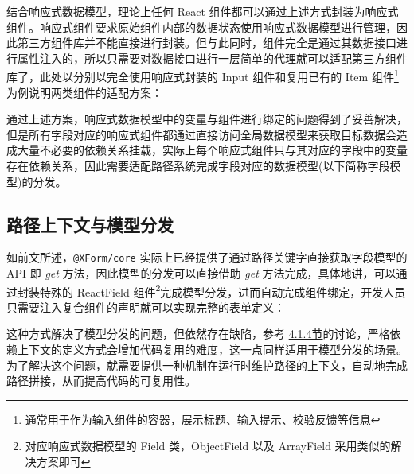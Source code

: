 \documentclass[winfonts,master,twoside]{njuthesis}
\makeatletter
\newcommand{\xform}[1]{\texttt{@XForm/#1}}
\makeatother
\begin{document}
结合响应式数据模型，理论上任何 React 组件都可以通过上述方式封装为响应式组件。响应式组件要求原始组件内部的数据状态使用响应式数据模型进行管理，因此第三方组件库并不能直接进行封装。但与此同时，组件完全是通过其数据接口进行属性注入的，所以只需要对数据接口进行一层简单的代理就可以适配第三方组件库了，此处以分别以完全使用响应式封装的 Input 组件和复用已有的 Item 组件\footnote{通常用于作为输入组件的容器，展示标题、输入提示、校验反馈等信息}为例说明两类组件的适配方案：

\begin{center}
    \begin{minipage}{0.45\textwidth}
        
    \end{minipage}\quad
    \begin{minipage}{0.45\textwidth}
        
    \end{minipage}
\end{center}

通过上述方案，响应式数据模型中的变量与组件进行绑定的问题得到了妥善解决，但是所有字段对应的响应式组件都通过直接访问全局数据模型来获取目标数据会造成大量不必要的依赖关系挂载，实际上每个响应式组件只与其对应的字段中的变量存在依赖关系，因此需要适配路径系统完成字段对应的数据模型(以下简称字段模型)的分发。

\subsection{路径上下文与模型分发}

如前文所述，\xform{core} 实际上已经提供了通过路径关键字直接获取字段模型的 API 即 \textit{get} 方法，因此模型的分发可以直接借助 \textit{get} 方法完成，具体地讲，可以通过封装特殊的 ReactField 组件\footnote{对应响应式数据模型的 Field 类，ObjectField 以及 ArrayField 采用类似的解决方案即可}完成模型分发，进而自动完成组件绑定，开发人员只需要注入复合组件的声明就可以实现完整的表单定义：



这种方式解决了模型分发的问题，但依然存在缺陷，参考 \hyperref[reactive-data-model-context-free-dependency]{4.1.4节}的讨论，严格依赖上下文的定义方式会增加代码复用的难度，这一点同样适用于模型分发的场景。为了解决这个问题，就需要提供一种机制在运行时维护路径的上下文，自动地完成路径拼接，从而提高代码的可复用性。
\end{document}
